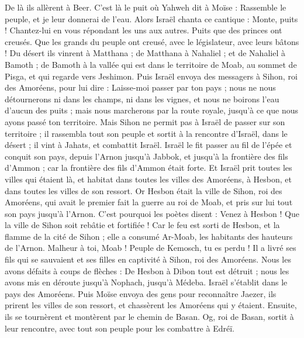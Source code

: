 \begin{multicols}{2}
De là ils allèrent à Beer. C'est là le puit où Yahweh dit à Moïse : Rassemble le peuple, et je leur donnerai de l'eau.
Alors Israël chanta ce cantique : Monte, puits ! Chantez-lui en vous répondant les uns aux autres.
Puits que des princes ont creusés. Que les grands du peuple ont creusé, avec le législateur, avec leurs bâtons ! Du désert ils vinrent à Matthana ;
de Matthana à Nahaliel ; et de Nahaliel à Bamoth ;
de Bamoth à la vallée qui est dans le territoire de Moab, au sommet de Pisga, et qui regarde vers Jeshimon.
Puis Israël envoya des messagers à Sihon, roi des Amoréens, pour lui dire :
Laisse-moi passer par ton pays ; nous ne nous détournerons ni dans les champs, ni dans les vignes, et nous ne boirons l'eau d'aucun des puits ; mais nous marcherons par la route royale, jusqu'à ce que nous ayons passé ton territoire.
Mais Sihon ne permit pas à Israël de passer sur son territoire ; il rassembla tout son peuple et sortit à la rencontre d'Israël, dans le désert ; il vint à Jahats, et combattit Israël.
Israël le fit passer au fil de l'épée et conquit son pays, depuis l'Arnon jusqu'à Jabbok, et jusqu'à la frontière des fils d'Ammon ; car la frontière des fils d'Ammon était forte.
Et Israël prit toutes les villes qui étaient là, et habitat dans toutes les villes des Amoréens, à Hesbon, et dans toutes les villes de son ressort.
Or Hesbon était la ville de Sihon, roi des Amoréens, qui avait le premier fait la guerre au roi de Moab, et pris sur lui tout son pays jusqu'à l'Arnon.
C'est pourquoi les poètes disent : Venez à Hesbon ! Que la ville de Sihon soit rebâtie et fortifiée !
Car le feu est sorti de Hesbon, et la flamme de la cité de Sihon ; elle a consumé Ar-Moab, les habitants des hauteurs de l'Arnon.
Malheur à toi, Moab ! Peuple de Kemosch, tu es perdu ! Il a livré ses fils qui se sauvaient et ses filles en captivité à Sihon, roi des Amoréens.
Nous les avons défaits à coups de flèches : De Hesbon à Dibon tout est détruit ; nous les avons mis en déroute jusqu'à Nophach, jusqu'à Médeba.
Israël s'établit dans le pays des Amoréens.
Puis Moïse envoya des gens pour reconnaître Jaezer, ils prirent les villes de son ressort, et chassèrent les Amoréens qui y étaient.
Ensuite, ils se tournèrent et montèrent par le chemin de Basan. Og, roi de Basan, sortit à leur rencontre, avec tout son peuple pour les combattre à Edréï.

\end{multicols}
